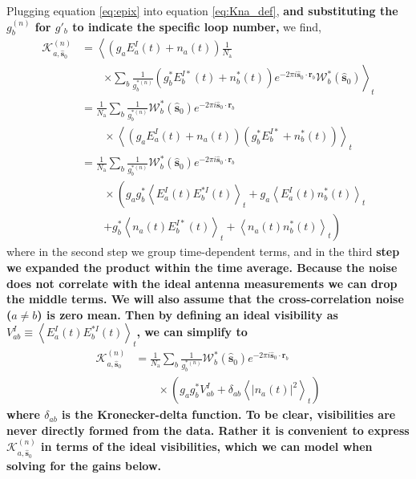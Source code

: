 \documentclass[a4paper,fleqn,usenatbib]{../mnras}
\newcommand{\Nant}{\ensuremath{N_{\mathrm{a}}}}
\newcommand{\spix}{\ensuremath{\hat{\mathbf{s}}_{0}}}
\newcommand{\Kna}[1][n]{\ensuremath{\mathcal{K}^{(#1)}_{a,\spix}}}
\newcommand{\rb}{\ensuremath{\mathbf{r}_b}}
\begin{document}
Plugging equation \ref{eq:epix} into equation \ref{eq:Kna_def}, 
\textbf{and substituting the $g^{(n)}_b$ for $g'_b$ to indicate the specific loop number,}
we find,
\begin{align}
\Kna & = \left<\left(g_a E_a^I(t)+n_a(t)\right) \frac{1}{\Nant} \right. \nonumber \\
& \qquad \left. \times \sum_b \frac{1}{g^{*(n)}_b}\left(g^*_bE_b^{I*}(t)+n^*_b(t)\right) e^{-2\pi i \spix \cdot \rb} \mathcal{W}^*_b(\spix)\right>_t \nonumber \\
& = \frac{1}{\Nant} \sum_b \frac{1}{g^{*(n)}_b} \mathcal{W}^*_b(\spix) e^{-2\pi i \spix \cdot \rb} \nonumber \\
& \qquad \times \left<\left(g_aE_a^I(t)+n_a(t)\right)\left(g^*_bE_b^{I*}+n^*_b(t)\right) \right>_t \nonumber \\
& = \frac{1}{\Nant} \sum_b \frac{1}{g^{*(n)}_b} \mathcal{W}^*_b(\spix) e^{-2\pi i \spix \cdot \rb} \nonumber \\
& \qquad \times \left(g_a g^*_b \left<E^I_a(t)E^{*I}_b(t)\right>_t + g_a\left<E_a^I(t)n^*_b(t)\right>_t \right. \nonumber \\
& \qquad \left. + g^*_b\left<n_a(t)E^{I*}_b(t)\right>_t + \left<n_a(t) n^*_b(t)\right>_t\right)  
\end{align}
where in the second step we group time-dependent terms, 
and in the third \textbf{step we expanded the product within the time average.
Because the noise does not correlate with the ideal antenna measurements we can
drop the middle terms. We will also assume that the cross-correlation noise ($a\ne b$) 
is zero mean. Then by defining an ideal visibility as
$V_{ab}^I \equiv \left<E^I_a(t)E^{*I}_b(t)\right>_t$, we can simplify to}
\begin{align}\label{eq:Kna}
\Kna & = \frac{1}{\Nant} \sum_b \frac{1}{g^{*(n)}_b} \mathcal{W}^*_b(\spix) e^{-2\pi i \spix \cdot \rb}\nonumber \\
& \qquad \times \left( g_ag_b^* V_{ab}^I + \delta_{ab}\left<|n_a(t)|^2\right>_t\right)
\end{align}
\textbf{where $\delta_{ab}$ is the Kronecker-delta function. To be clear, visibilities are never directly 
formed from the data. Rather it is convenient to express $\Kna$ in terms of the ideal 
visibilities, which we can model when solving for the gains below.}
\end{document}
